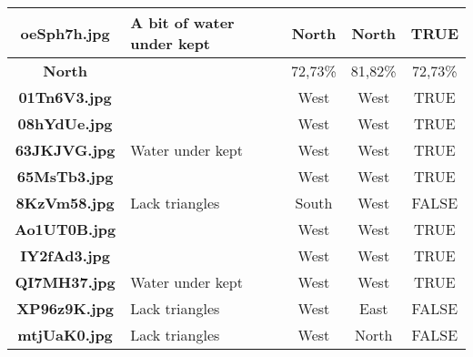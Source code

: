 \documentclass{article}
\begin{document}
\begin{table}[h!]
{\begin{tabular}{|c|p{4cm}|c|c|c|}
            \textbf{oeSph7h.jpg} & A bit of water under kept    & North                         & North                            & TRUE                 \\ \hline
            \rowcolor{gray!40}
            \textbf{North}       &                              & 72,73\%                       & 81,82\%                          & 72,73\%              \\ \hline
            \rowcolor{gray!0}
            \textbf{01Tn6V3.jpg} &                              & West                          & West                             & TRUE                 \\ \hline
            \rowcolor{gray!10}
            \textbf{08hYdUe.jpg} &                              & West                          & West                             & TRUE                 \\ \hline
            \rowcolor{gray!0}
            \textbf{63JKJVG.jpg} & Water under kept             & West                          & West                             & TRUE                 \\ \hline
            \rowcolor{gray!10}
            \textbf{65MsTb3.jpg} &                              & West                          & West                             & TRUE                 \\ \hline
            \rowcolor{gray!0}
            \textbf{8KzVm58.jpg} & Lack triangles               & South                         & West                             & FALSE                \\ \hline
            \rowcolor{gray!10}
            \textbf{Ao1UT0B.jpg} &                              & West                          & West                             & TRUE                 \\ \hline
            \rowcolor{gray!0}
            \textbf{IY2fAd3.jpg} &                              & West                          & West                             & TRUE                 \\ \hline
            \rowcolor{gray!10}
            \textbf{QI7MH37.jpg} & Water under kept             & West                          & West                             & TRUE                 \\ \hline
            \rowcolor{gray!0}
            \textbf{XP96z9K.jpg} & Lack triangles               & West                          & East                             & FALSE                \\ \hline
            \rowcolor{gray!10}
            \textbf{mtjUaK0.jpg} & Lack triangles               & West                          & North                            & FALSE                \\ \hline

\end{tabular}}
\end{table}
\end{document}
